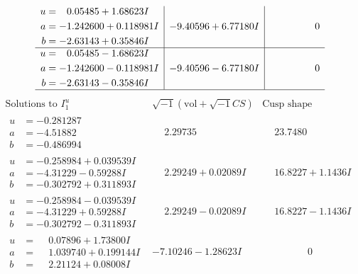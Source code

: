 \documentclass[1p]{elsarticle_modified}
\theoremstyle{definition}
\newcommand{\I}{\sqrt{-1}}
\begin{document}
$$\begin{array}{c|c|c}
\begin{aligned}
u &= \phantom{-}0.05485 + 1.68623 I \\
a &= -1.242600 + 0.118981 I \\
b &= -2.63143 + 0.35846 I\end{aligned}
 & -9.40596 + 6.77180 I & \phantom{-0.000000 } 0 \\ \hline\begin{aligned}
u &= \phantom{-}0.05485 - 1.68623 I \\
a &= -1.242600 - 0.118981 I \\
b &= -2.63143 - 0.35846 I\end{aligned}
 & -9.40596 - 6.77180 I & \phantom{-0.000000 } 0\\
 \hline 
 \end{array}$$\newpage$$\begin{array}{c|c|c}  
\text{Solutions to }I^u_{1}& \I (\text{vol} + \sqrt{-1}CS) & \text{Cusp shape}\\
 \hline 
\begin{aligned}
u &= -0.281287\phantom{ +0.000000I} \\
a &= -4.51882\phantom{ +0.000000I} \\
b &= -0.486994\phantom{ +0.000000I}\end{aligned}
 & \phantom{-}2.29735\phantom{ +0.000000I} & \phantom{-}23.7480\phantom{ +0.000000I} \\ \hline\begin{aligned}
u &= -0.258984 + 0.039539 I \\
a &= -4.31229 - 0.59288 I \\
b &= -0.302792 + 0.311893 I\end{aligned}
 & \phantom{-}2.29249 + 0.02089 I & \phantom{-}16.8227 + 1.1436 I \\ \hline\begin{aligned}
u &= -0.258984 - 0.039539 I \\
a &= -4.31229 + 0.59288 I \\
b &= -0.302792 - 0.311893 I\end{aligned}
 & \phantom{-}2.29249 - 0.02089 I & \phantom{-}16.8227 - 1.1436 I \\ \hline\begin{aligned}
u &= \phantom{-}0.07896 + 1.73800 I \\
a &= \phantom{-}1.039740 + 0.199144 I \\
b &= \phantom{-}2.21124 + 0.08008 I\end{aligned}
 & -7.10246 - 1.28623 I & \phantom{-0.000000 } 0 \\ \hline\begin{aligned}

\end{aligned}
\end{array}$$
\end{document}
